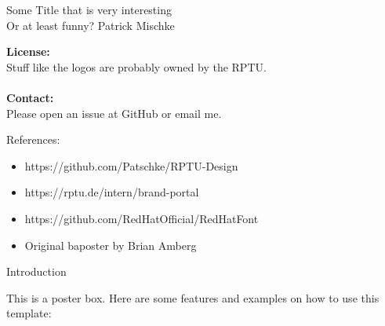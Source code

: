 \documentclass[
  a0paper,
  portrait,
  fontscale=.35 %
  ]{baposterrptu}
\begin{document}
\begin{poster}{
  }
  {}%
  {Some Title that is very interesting\\
    \sf Or at least funny?}
  {Patrick Mischke}
  {\rptuLogo}
  {
    \begin{minipage}{.8\footerheight}
    \end{minipage}
    \hfill
    \begin{minipage}{.4\paperwidth}
      \textbf{License:}\\
      Stuff like the logos are probably owned by the RPTU.\\\\
      \textbf{Contact:}\\
      Please open an issue at GitHub or email me.
    \end{minipage}
  }
  {
    References:
    \begin{itemize}
      \item https://github.com/Patschke/RPTU-Design
      \item https://rptu.de/intern/brand-portal
      \item https://github.com/RedHatOfficial/RedHatFont
      \item Original baposter by Brian Amberg
    \end{itemize}
  }
  \begin{posterbox}[name=intro,column=0,row=0]{Introduction}

    This is a poster box. Here are some features and examples on how to use this template:


\end{posterbox}
\end{poster}
\end{document}
